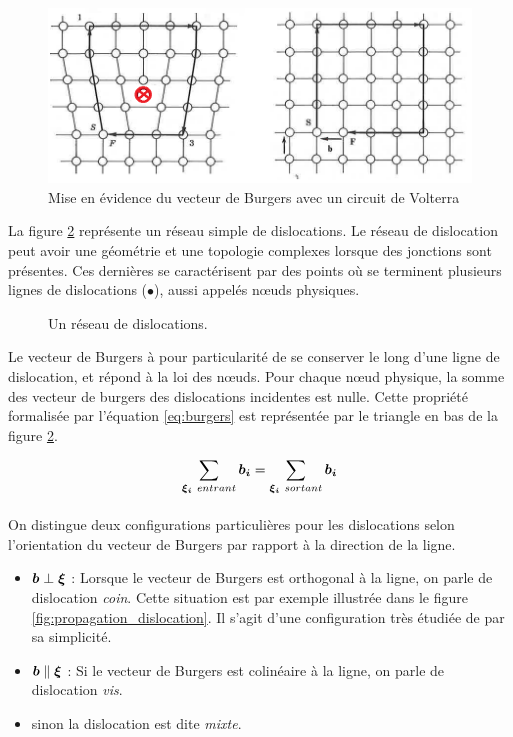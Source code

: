\documentclass[11pt,class=article,float=false,crop=false]{standalone}
\begin{document}
\begin{figure}[H]
	\centering
	\includegraphics[width=0.6\linewidth]{img/burgers-volterra}
	\caption{Mise en évidence du vecteur de Burgers avec un circuit de Volterra}
	\label{fig:burgers:volterra}
\end{figure} 

La figure \ref{fig:dislocations:schema} représente un réseau simple de dislocations. Le réseau de dislocation peut avoir une géométrie et une topologie complexes lorsque des jonctions sont présentes. Ces dernières se caractérisent par des points où se terminent plusieurs lignes de dislocations ($\bullet$), aussi appelés nœuds physiques.

\begin{figure}[H]
	\centering
	\caption{Un réseau de dislocations.}
	\label{fig:dislocations:schema}
\end{figure}

Le vecteur de Burgers à pour particularité de se conserver le long d'une ligne de dislocation, et répond à la loi des nœuds. Pour chaque nœud physique, la somme des vecteur de burgers des dislocations incidentes est nulle. Cette propriété formalisée par l'équation \ref{eq:burgers} est représentée par le triangle en bas de la figure \ref{fig:dislocations:schema}.

\begin{equation}
\sum_{\bm{\xi _i}~entrant} \bm{b_i} = \sum_{\bm{\xi _i}~sortant} \bm{b_i}
\label{eq:burgers}
\end{equation}

\paragraph{}
On distingue deux configurations particulières pour les dislocations selon l'orientation du vecteur de Burgers par rapport à la direction de la ligne.
\begin{itemize}
	\item $\bm{b} \perp \bm{\xi}$ : Lorsque le vecteur de Burgers est orthogonal à la ligne, on parle de dislocation \textit{coin}. Cette situation est par exemple illustrée dans le figure \ref{fig:propagation_dislocation}. Il s'agit d'une configuration très étudiée de par sa simplicité.
	
	\item $\bm{b} \parallel \bm{\xi}$ : Si le vecteur de Burgers est colinéaire à la ligne, on parle de dislocation \textit{vis}.
	
	\item sinon la dislocation est dite \textit{mixte}.
	
\end{itemize}
\end{document}
